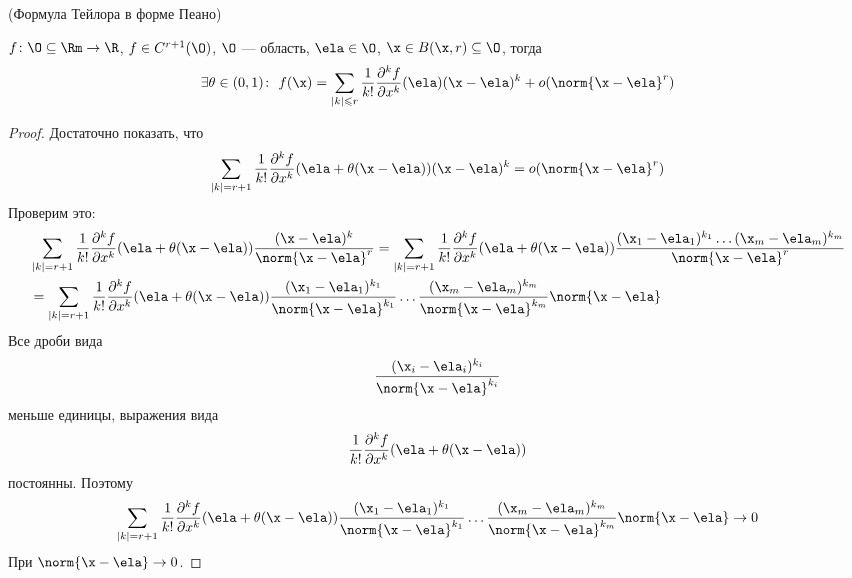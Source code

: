 \begin{theorem}(Формула Тейлора в форме Пеано)

    $f \colon \O \subseteq \Rm \to \R$, $f \in C^{r+1}(\O)$, $\O$ --- область,
    $\ela \in \O$, $\x \in B(\x, r) \subseteq \O$, тогда
\[
    \exists \theta \in (0, 1)\colon~
    f(\x) = \sum_{|k| \leqslant r}{\frac{1}{k!}
    \frac{\partial^k f}{\partial x^k}(\ela) (\x - \ela)^k}
    + o(\norm{\x - \ela}^r)
\]
\end{theorem}
\begin{proof}
    Достаточно показать, что
\[
    \sum_{|k| = r+1}{\frac{1}{k!} \frac{\partial^k f}{\partial x^k}(\ela +
    \theta(\x - \ela))(\x - \ela)^k} = o(\norm{\x - \ela}^r)
\]
    Проверим это:
\begin{align*}
    &\sum_{|k| = r+1}{\frac{1}{k!} \frac{\partial^k f}{\partial x^k}(\ela +
    \theta(\x - \ela)) \frac{(\x - \ela)^k}{\norm{\x - \ela}^r}}
    = \sum_{|k| = r+1}{\frac{1}{k!} \frac{\partial^k f}{\partial x^k}(\ela +
    \theta(\x - \ela)) \frac{(\x_1 - \ela_1)^{k_1} \ldots (\x_m -
    \ela_m)^{k_m}}{\norm{\x - \ela}^r}} \\
    &= \sum_{|k| = r+1}{\frac{1}{k!} \frac{\partial^k f}{\partial x^k}(\ela +
    \theta(\x - \ela)) \frac{(\x_1 - \ela_1)^{k_1}}{\norm{\x - \ela}^{k_1}} \ldots
    \frac{(\x_m - \ela_m)^{k_m}}{\norm{\x - \ela}^{k_m}}} \norm{\x - \ela}
\end{align*}
    Все дроби вида
\[
    \frac{(\x_i - \ela_i)^{k_i}}{\norm{\x - \ela}^{k_i}}
\]
    меньше единицы, выражения вида
\[
    \frac{1}{k!} \frac{\partial^k f}{\partial x^k}(\ela + \theta(\x - \ela))
\]
    постоянны. Поэтому
\[
    \sum_{|k| = r+1}{\frac{1}{k!} \frac{\partial^k f}{\partial x^k}(\ela +
    \theta(\x - \ela)) \frac{(\x_1 - \ela_1)^{k_1}}{\norm{\x - \ela}^{k_1}}
    \ldots \frac{(\x_m - \ela_m)^{k_m}}{\norm{\x - \ela}^{k_m}}} \norm{\x -
    \ela} \to 0
\]
    При $\norm{\x - \ela} \to 0$.
\end{proof}
